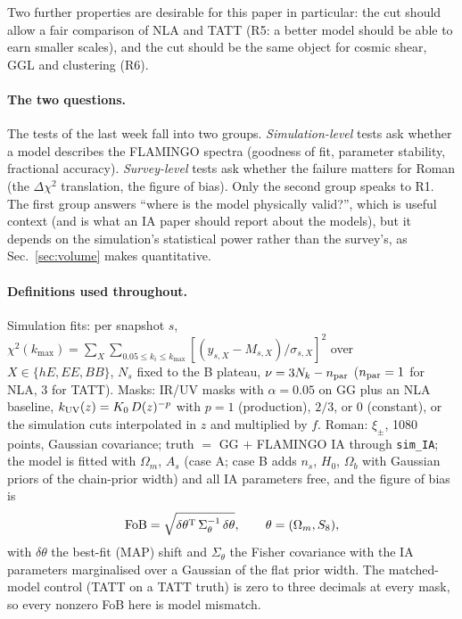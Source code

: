 \documentclass[11pt]{article}
\newcommand{\kmax}{k_{\max}}
\newcommand{\kuv}{k_{\rm UV}}
\newcommand{\dchi}{\Delta\chi^2}
\newcommand{\fob}{\mathrm{FoB}}
\begin{document}
Two further properties are desirable for this paper in particular: the cut
should allow a fair comparison of NLA and TATT (R5: a better model should be
able to earn smaller scales), and the cut should be the same object for
cosmic shear, GGL and clustering (R6).

\paragraph{The two questions.} The tests of the last week fall into two groups.
\emph{Simulation-level} tests ask whether a model describes the FLAMINGO
spectra (goodness of fit, parameter stability, fractional accuracy).
\emph{Survey-level} tests ask whether the failure matters for Roman (the
$\dchi$ translation, the figure of bias). Only the second group speaks to
R1. The first group answers ``where is the model physically valid?'', which
is useful context (and is what an IA paper should report about the models),
but it depends on the simulation's statistical power rather than the
survey's, as Sec.~\ref{sec:volume} makes quantitative.

\paragraph{Definitions used throughout.}
Simulation fits: per snapshot $s$, $\chi^2(\kmax) = \sum_{X}\sum_{0.05\le
k_i\le\kmax}[(y_{s,X} - M_{s,X})/\sigma_{s,X}]^2$ over $X \in \{hE, EE,
BB\}$, $N_s$ fixed to the B plateau, $\nu = 3N_k - n_{\rm par}$
($n_{\rm par} = 1$ for NLA, 3 for TATT). Masks: IR/UV masks with $\alpha =
0.05$ on GG plus an NLA baseline, $\kuv(z) = K_0\,D(z)^{-p}$ with $p = 1$
(production), $2/3$, or 0 (constant), or the simulation cuts interpolated in
$z$ and multiplied by $f$. Roman: $\xi_\pm$, 1080 points, Gaussian
covariance; truth $=$ GG $+$ FLAMINGO IA through \texttt{sim\_IA}; the model
is fitted with $\Omega_m$, $A_s$ (case A; case B adds $n_s$, $H_0$,
$\Omega_b$ with Gaussian priors of the chain-prior width) and all IA
parameters free, and the figure of bias is
\begin{equation}
\fob = \sqrt{\delta\theta^{\rm T}\,\Sigma_\theta^{-1}\,\delta\theta},
\qquad \theta = (\Omega_m, S_8),
\label{eq:fob}
\end{equation}
with $\delta\theta$ the best-fit (MAP) shift and $\Sigma_\theta$ the Fisher
covariance with the IA parameters marginalised over a Gaussian of the flat
prior width. The matched-model control (TATT on a TATT truth) is zero to three
decimals at every mask, so every nonzero FoB here is model mismatch.
\end{document}
